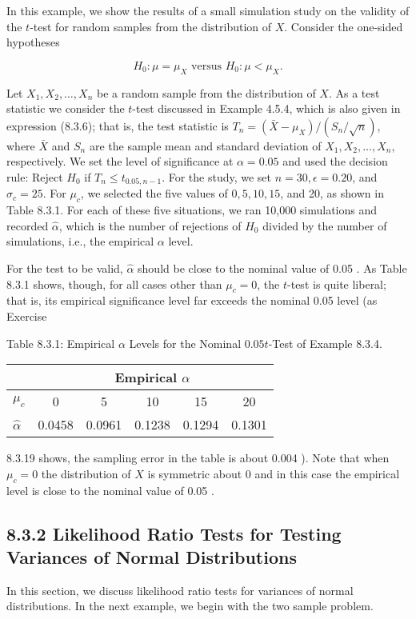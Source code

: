 In this example, we show the results of a small simulation study on the validity of the $t$-test for random samples from the distribution of $X$. Consider the one-sided hypotheses

$$
H_{0}: \mu=\mu_{X} \text { versus } H_{0}: \mu<\mu_{X} .
$$

Let $X_{1}, X_{2}, \ldots, X_{n}$ be a random sample from the distribution of $X$. As a test statistic we consider the $t$-test discussed in Example 4.5.4, which is also given in expression (8.3.6); that is, the test statistic is $T_{n}=\left(\bar{X}-\mu_{X}\right) /\left(S_{n} / \sqrt{n}\right)$, where $\bar{X}$ and $S_{n}$ are the sample mean and standard deviation of $X_{1}, X_{2}, \ldots, X_{n}$, respectively. We set the level of significance at $\alpha=0.05$ and used the decision rule: Reject $H_{0}$ if $T_{n} \leq t_{0.05, n-1}$. For the study, we set $n=30, \epsilon=0.20$, and $\sigma_{c}=25$. For $\mu_{c}$, we selected the five values of $0,5,10,15$, and 20, as shown in Table 8.3.1. For each of these five situations, we ran 10,000 simulations and recorded $\widehat{\alpha}$, which is the number of rejections of $H_{0}$ divided by the number of simulations, i.e., the empirical $\alpha$ level.

For the test to be valid, $\widehat{\alpha}$ should be close to the nominal value of 0.05 . As Table 8.3.1 shows, though, for all cases other than $\mu_{c}=0$, the $t$-test is quite liberal; that is, its empirical significance level far exceeds the nominal 0.05 level (as Exercise

Table 8.3.1: Empirical $\alpha$ Levels for the Nominal $0.05 t$-Test of Example 8.3.4.

\begin{center}
\begin{tabular}{|l|c|c|c|c|c|}
\hline
 & \multicolumn{5}{|c|}{Empirical $\alpha$} \\
\hline
$\mu_{c}$ & 0 & 5 & 10 & 15 & 20 \\
\hline
$\widehat{\alpha}$ & 0.0458 & 0.0961 & 0.1238 & 0.1294 & 0.1301 \\
\hline
\end{tabular}
\end{center}

8.3.19 shows, the sampling error in the table is about 0.004 ). Note that when $\mu_{c}=0$ the distribution of $X$ is symmetric about 0 and in this case the empirical level is close to the nominal value of 0.05 .

\subsection*{8.3.2 Likelihood Ratio Tests for Testing Variances of Normal Distributions}
In this section, we discuss likelihood ratio tests for variances of normal distributions. In the next example, we begin with the two sample problem.

